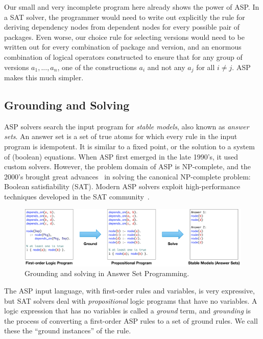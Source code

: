 Our small and very incomplete program here already shows the power of ASP. In a SAT
solver, the programmer would need to write out explicitly the rule for deriving
dependency nodes from dependent nodes for every possible pair of packages. Even worse,
our choice rule for selecting versions would need to be written out for every
combination of package and version, and an enormous combination of logical operators
constructed to ensure that for any group of versions \texttt{$a_1, ..., a_n$}, one of
the constructions \texttt{$a_i$} and not any \texttt{$a_j$} for all $i\neq{j}$. ASP
makes this much simpler.


\subsection{Grounding and Solving}

ASP solvers search the input program for {\it stable models}, also known as
\textit{answer sets}. An answer set is a set of true atoms for which every rule in the
input program is idempotent. It is similar to a fixed point, or the solution to a system
of (boolean) equations. When ASP first emerged in the late 1990's, it used custom solvers.
However, the problem domain of ASP is NP-complete, and the 2000's brought great
advances~\cite{moskewicz2001chaff} in solving the canonical NP-complete problem: Boolean
satisfiability (SAT). Modern ASP solvers exploit high-performance techniques developed
in the SAT community~\cite{gebser+:asp-book}.

\begin{figure}[t]
  \centering
  \includegraphics[width=.8\textwidth]{figures/asp-grounding.pdf}
  \caption{
    Grounding and solving in Answer Set Programming.
    \label{fig:ground-solve}
    \vspace{-1em}
  }
\end{figure}

The ASP input language, with first-order rules and variables, is very expressive, but
SAT solvers deal with {\it propositional} logic programs that have no variables. A logic
expression that has no variables is called a {\it ground} term, and {\it grounding} is
the process of converting a first-order ASP rules to a set of ground rules. We call
these the ``ground instances'' of the rule.

